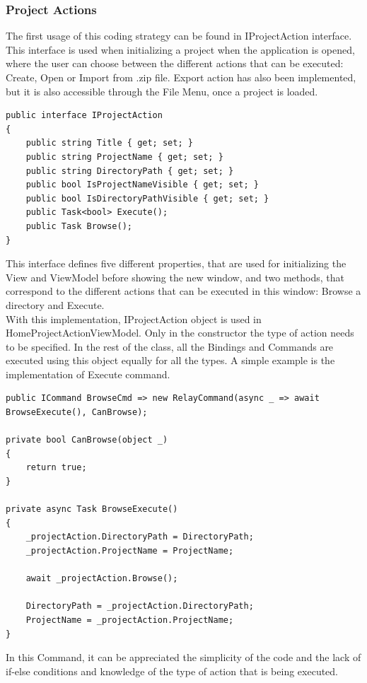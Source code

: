 \subsubsection{Project Actions}
The first usage of this coding strategy can be found in IProjectAction interface. This interface is used when initializing a project when the application is opened, where the user can choose between the different actions that can be executed: Create, Open or Import from .zip file. Export action has also been implemented, but it is also accessible through the File Menu, once a project is loaded.\smallskip
\begin{lstlisting}
public interface IProjectAction
{
    public string Title { get; set; }
    public string ProjectName { get; set; }
    public string DirectoryPath { get; set; }
    public bool IsProjectNameVisible { get; set; }
    public bool IsDirectoryPathVisible { get; set; }
    public Task<bool> Execute();
    public Task Browse();
}
\end{lstlisting}
This interface defines five different properties, that are used for initializing the View and ViewModel before showing the new window, and two methods, that correspond to the different actions that can be executed in this window: Browse a directory and Execute.\smallskip\\
With this implementation, IProjectAction object is used in HomeProjectActionViewModel. Only in the constructor the type of action needs to be specified. In the rest of the class, all the Bindings and Commands are executed using this object equally for all the types. A simple example is the implementation of Execute command.\smallskip\\
\begin{lstlisting}
public ICommand BrowseCmd => new RelayCommand(async _ => await BrowseExecute(), CanBrowse);

private bool CanBrowse(object _)
{
    return true;
}

private async Task BrowseExecute()
{
    _projectAction.DirectoryPath = DirectoryPath;
    _projectAction.ProjectName = ProjectName;

    await _projectAction.Browse();
    
    DirectoryPath = _projectAction.DirectoryPath;
    ProjectName = _projectAction.ProjectName;
}
\end{lstlisting} 
In this Command, it can be appreciated the simplicity of the code and the lack of if-else conditions and knowledge of the type of action that is being executed.
